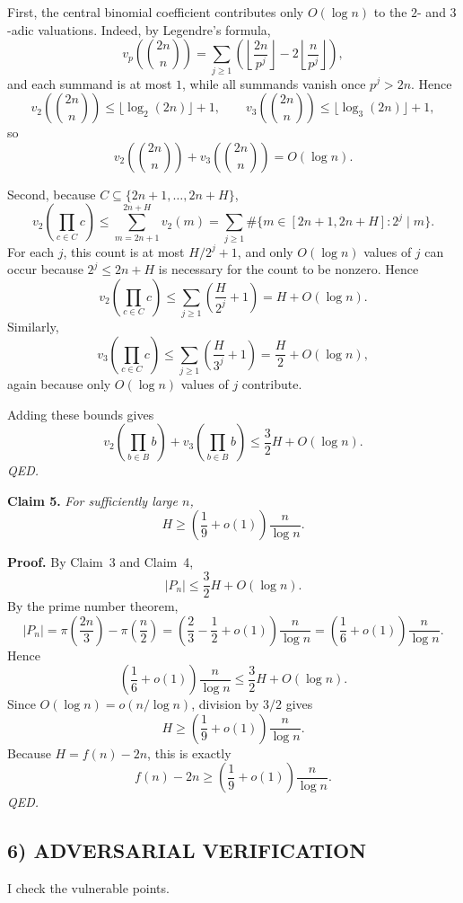First, the central binomial coefficient contributes only $O(\log n)$ to the $2$- and $3$-adic valuations.
Indeed, by Legendre's formula,
\[
v_p\!\left({2n\choose n}\right)
=
\sum_{j\ge 1}\left(\left\lfloor\frac{2n}{p^j}\right\rfloor-2\left\lfloor\frac{n}{p^j}\right\rfloor\right),
\]
and each summand is at most $1$, while all summands vanish once $p^j>2n$.
Hence
\[
v_2\!\left({2n\choose n}\right)\le \lfloor \log_2(2n)\rfloor+1,
\qquad
v_3\!\left({2n\choose n}\right)\le \lfloor \log_3(2n)\rfloor+1,
\]
so
\[
v_2\!\left({2n\choose n}\right)+v_3\!\left({2n\choose n}\right)=O(\log n).
\]

Second, because $C\subseteq \{2n+1,\dots,2n+H\}$,
\[
v_2\!\left(\prod_{c\in C}c\right)
\le
\sum_{m=2n+1}^{2n+H} v_2(m)
=
\sum_{j\ge 1} \#\{m\in[2n+1,2n+H]:2^j\mid m\}.
\]
For each $j$, this count is at most $H/2^j+1$, and only $O(\log n)$ values of $j$ can occur because $2^j\le 2n+H$ is necessary for the count to be nonzero.
Hence
\[
v_2\!\left(\prod_{c\in C}c\right)
\le
\sum_{j\ge 1}\left(\frac{H}{2^j}+1\right)
=
H+O(\log n).
\]
Similarly,
\[
v_3\!\left(\prod_{c\in C}c\right)
\le
\sum_{j\ge 1}\left(\frac{H}{3^j}+1\right)
=
\frac{H}{2}+O(\log n),
\]
again because only $O(\log n)$ values of $j$ contribute.

Adding these bounds gives
\[
v_2\!\left(\prod_{b\in B}b\right)+v_3\!\left(\prod_{b\in B}b\right)
\le
\frac{3}{2}H+O(\log n).
\]
\hfill\textit{QED.}

\medskip
\noindent\textbf{Claim 5.}
\emph{For sufficiently large $n$,}
\[
H\ge \left(\frac{1}{9}+o(1)\right)\frac{n}{\log n}.
\]

\medskip
\noindent\textbf{Proof.}
By Claim~3 and Claim~4,
\[
|P_n|\le \frac{3}{2}H+O(\log n).
\]
By the prime number theorem,
\[
|P_n|
=
\pi\!\left(\frac{2n}{3}\right)-\pi\!\left(\frac{n}{2}\right)
=
\left(\frac{2}{3}-\frac{1}{2}+o(1)\right)\frac{n}{\log n}
=
\left(\frac{1}{6}+o(1)\right)\frac{n}{\log n}.
\]
Hence
\[
\left(\frac{1}{6}+o(1)\right)\frac{n}{\log n}
\le
\frac{3}{2}H+O(\log n).
\]
Since $O(\log n)=o(n/\log n)$, division by $3/2$ gives
\[
H\ge \left(\frac{1}{9}+o(1)\right)\frac{n}{\log n}.
\]
Because $H=f(n)-2n$, this is exactly
\[
f(n)-2n\ge \left(\frac{1}{9}+o(1)\right)\frac{n}{\log n}.
\]
\hfill\textit{QED.}

\subsection*{6) ADVERSARIAL VERIFICATION}

I check the vulnerable points.

